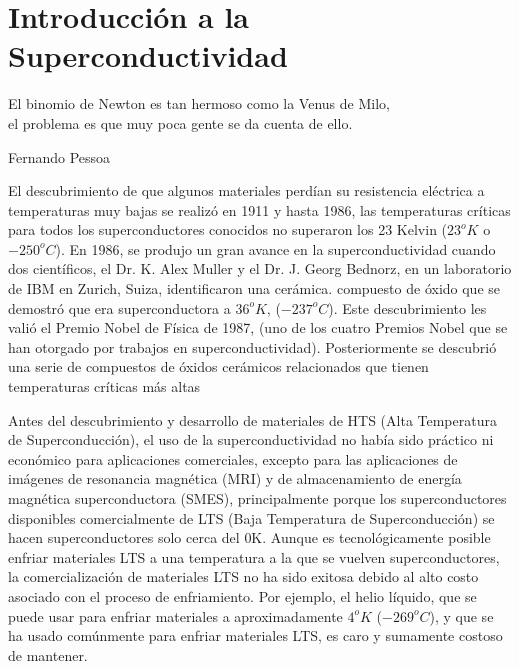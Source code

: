 
\chapter{Introducción a la Superconductividad} %

\label{Chapter4} %



\vspace{10mm}

\begin{center}
El binomio de Newton es tan hermoso  como  la  Venus  de  Milo,\\  el  problema  es  que  muy  poca  gente  se  da  cuenta  de  ello.

\hspace{8.0cm} Fernando Pessoa\\
\end{center}

\vspace{10mm}


El descubrimiento de que algunos materiales perdían su resistencia eléctrica a temperaturas muy bajas se realizó en 1911 y hasta 1986, las temperaturas críticas para todos los superconductores conocidos no superaron los 23 Kelvin ($23^{o}K$ o $-250^{o}C$). En 1986, se produjo un gran avance en la superconductividad cuando dos científicos, el Dr. K. Alex Muller y el Dr. J. Georg Bednorz, en un laboratorio de IBM en Zurich, Suiza, identificaron una cerámica. compuesto de óxido que se demostró que era superconductora a $36^{o}K$, ($-237^{o}C$). Este descubrimiento les valió el Premio Nobel de Física de 1987, (uno de los cuatro Premios Nobel que se han otorgado por trabajos en superconductividad). Posteriormente se descubrió una serie de compuestos de óxidos cerámicos relacionados que tienen temperaturas críticas más altas

Antes del descubrimiento y desarrollo de materiales de HTS (Alta Temperatura de Superconducción), el uso de la superconductividad no había sido práctico ni económico para aplicaciones comerciales, excepto para las aplicaciones de imágenes de resonancia magnética (MRI) y de almacenamiento de energía magnética superconductora (SMES), principalmente porque los superconductores disponibles comercialmente de LTS (Baja Temperatura de Superconducción) se hacen superconductores solo cerca del 0K. Aunque es tecnológicamente posible enfriar materiales LTS a una temperatura a la que se vuelven superconductores, la comercialización de materiales LTS no ha sido exitosa debido al alto costo asociado con el proceso de enfriamiento. Por ejemplo, el helio líquido, que se puede usar para enfriar materiales a aproximadamente $4^{o}K$ ($-269^{o}C$), y que se ha usado comúnmente para enfriar materiales LTS, es caro y sumamente costoso de mantener.

